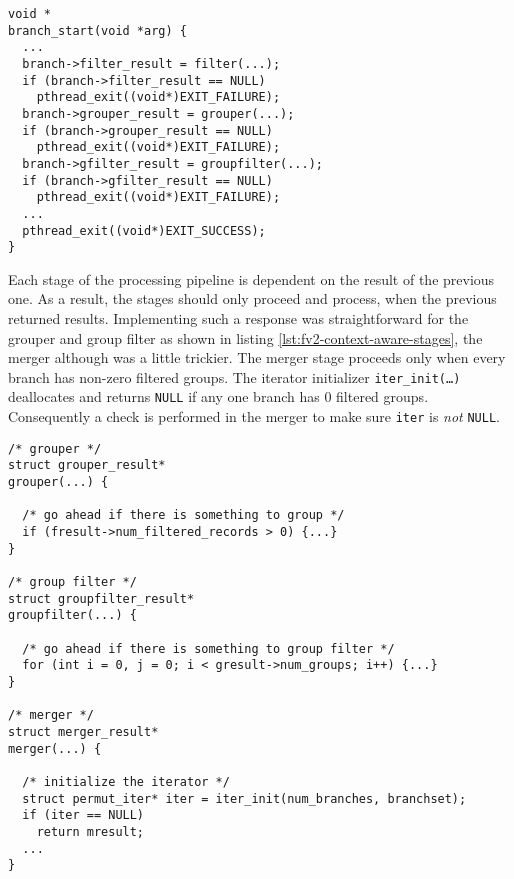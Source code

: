 \begin{lstlisting}
void *
branch_start(void *arg) {
  ...
  branch->filter_result = filter(...);
  if (branch->filter_result == NULL)
    pthread_exit((void*)EXIT_FAILURE);
  branch->grouper_result = grouper(...);
  if (branch->grouper_result == NULL)
    pthread_exit((void*)EXIT_FAILURE);
  branch->gfilter_result = groupfilter(...);
  if (branch->gfilter_result == NULL)
    pthread_exit((void*)EXIT_FAILURE);
  ...
  pthread_exit((void*)EXIT_SUCCESS);
}
\end{lstlisting}




Each stage of the processing pipeline is dependent on the result of the
previous one. As a result, the stages should only proceed and process, when
the previous returned results. Implementing such a response was
straightforward  for the grouper and
group filter as shown in listing \ref{lst:fv2-context-aware-stages}, the
merger although was a little trickier.  The merger stage proceeds only when
every branch has non-zero filtered groups.  The iterator initializer
\texttt{iter\_init(\ldots)} deallocates and returns \texttt{NULL} if any one
branch has $0$ filtered groups.  Consequently a check is performed in the
merger to make sure \texttt{iter} is \emph{not} \texttt{NULL}.

\begin{lstlisting}
/* grouper */
struct grouper_result*
grouper(...) {

  /* go ahead if there is something to group */
  if (fresult->num_filtered_records > 0) {...}
}

/* group filter */
struct groupfilter_result*
groupfilter(...) {

  /* go ahead if there is something to group filter */
  for (int i = 0, j = 0; i < gresult->num_groups; i++) {...}
}

/* merger */
struct merger_result*
merger(...) {

  /* initialize the iterator */
  struct permut_iter* iter = iter_init(num_branches, branchset);
  if (iter == NULL)
    return mresult;
  ...
}
\end{lstlisting}




